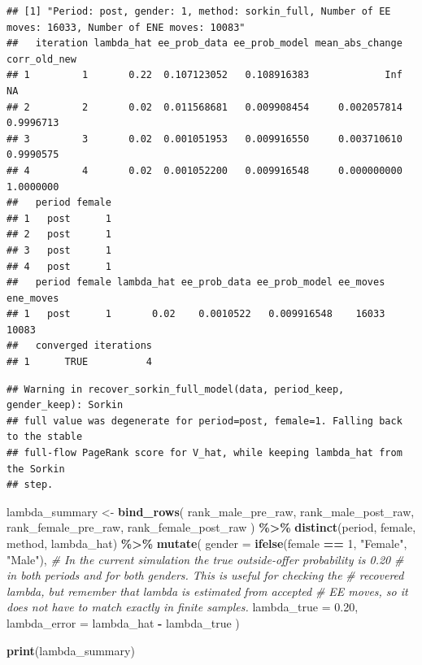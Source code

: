 \documentclass[
]{article}
\newenvironment{Shaded}{\begin{snugshade}}{\end{snugshade}}
\newcommand{\AttributeTok}[1]{\textcolor[rgb]{0.13,0.29,0.53}{#1}}
\newcommand{\CommentTok}[1]{\textcolor[rgb]{0.56,0.35,0.01}{\textit{#1}}}
\newcommand{\DecValTok}[1]{\textcolor[rgb]{0.00,0.00,0.81}{#1}}
\newcommand{\FloatTok}[1]{\textcolor[rgb]{0.00,0.00,0.81}{#1}}
\newcommand{\FunctionTok}[1]{\textcolor[rgb]{0.13,0.29,0.53}{\textbf{#1}}}
\newcommand{\NormalTok}[1]{#1}
\newcommand{\OtherTok}[1]{\textcolor[rgb]{0.56,0.35,0.01}{#1}}
\newcommand{\SpecialCharTok}[1]{\textcolor[rgb]{0.81,0.36,0.00}{\textbf{#1}}}
\newcommand{\StringTok}[1]{\textcolor[rgb]{0.31,0.60,0.02}{#1}}
\begin{document}
\begin{verbatim}
## [1] "Period: post, gender: 1, method: sorkin_full, Number of EE moves: 16033, Number of ENE moves: 10083"
##   iteration lambda_hat ee_prob_data ee_prob_model mean_abs_change corr_old_new
## 1         1       0.22  0.107123052   0.108916383             Inf           NA
## 2         2       0.02  0.011568681   0.009908454     0.002057814    0.9996713
## 3         3       0.02  0.001051953   0.009916550     0.003710610    0.9990575
## 4         4       0.02  0.001052200   0.009916548     0.000000000    1.0000000
##   period female
## 1   post      1
## 2   post      1
## 3   post      1
## 4   post      1
##   period female lambda_hat ee_prob_data ee_prob_model ee_moves ene_moves
## 1   post      1       0.02    0.0010522   0.009916548    16033     10083
##   converged iterations
## 1      TRUE          4
\end{verbatim}

\begin{verbatim}
## Warning in recover_sorkin_full_model(data, period_keep, gender_keep): Sorkin
## full value was degenerate for period=post, female=1. Falling back to the stable
## full-flow PageRank score for V_hat, while keeping lambda_hat from the Sorkin
## step.
\end{verbatim}

\begin{Shaded}
\begin{Highlighting}[]
\NormalTok{lambda\_summary }\OtherTok{\textless{}{-}} \FunctionTok{bind\_rows}\NormalTok{(}
\NormalTok{    rank\_male\_pre\_raw,}
\NormalTok{    rank\_male\_post\_raw,}
\NormalTok{    rank\_female\_pre\_raw,}
\NormalTok{    rank\_female\_post\_raw}
\NormalTok{) }\SpecialCharTok{\%\textgreater{}\%}
    \FunctionTok{distinct}\NormalTok{(period, female, method, lambda\_hat) }\SpecialCharTok{\%\textgreater{}\%}
    \FunctionTok{mutate}\NormalTok{(}
        \AttributeTok{gender =} \FunctionTok{ifelse}\NormalTok{(female }\SpecialCharTok{==} \DecValTok{1}\NormalTok{, }\StringTok{"Female"}\NormalTok{, }\StringTok{"Male"}\NormalTok{),}
        \CommentTok{\# In the current simulation the true outside{-}offer probability is 0.20}
        \CommentTok{\# in both periods and for both genders. This is useful for checking the}
        \CommentTok{\# recovered lambda, but remember that lambda is estimated from accepted}
        \CommentTok{\# EE moves, so it does not have to match exactly in finite samples.}
        \AttributeTok{lambda\_true =} \FloatTok{0.20}\NormalTok{,}
        \AttributeTok{lambda\_error =}\NormalTok{ lambda\_hat }\SpecialCharTok{{-}}\NormalTok{ lambda\_true}
\NormalTok{    )}

\FunctionTok{print}\NormalTok{(lambda\_summary)}
\end{Highlighting}
\end{Shaded}
\end{document}
